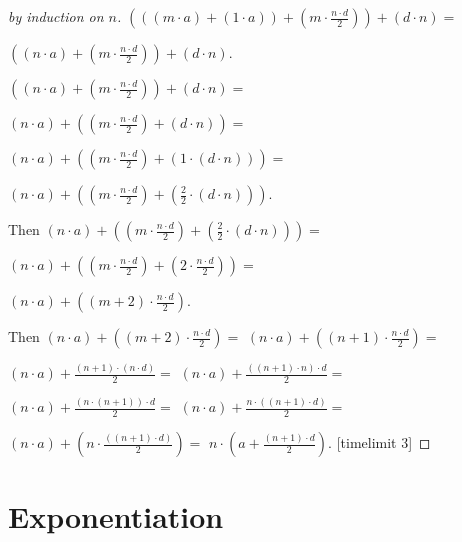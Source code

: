 \documentclass{article}
\begin{document}
\begin{forthel}
\begin{proof}[by induction on $n$]
$(((m \cdot a) + (1 \cdot a)) +  (m \cdot \frac{n \cdot d}{2})) + (d \cdot n) =$

$((n \cdot a) +  (m \cdot \frac{n \cdot d}{2})) + (d \cdot n)$.

$((n \cdot a) +  (m \cdot \frac{n \cdot d}{2})) + (d \cdot n) =$

$(n \cdot a) +  ((m \cdot \frac{n \cdot d}{2}) + (d \cdot n))=$

$(n \cdot a) +  ((m \cdot \frac{n \cdot d}{2}) + (1 \cdot (d \cdot n)))=$

$(n \cdot a) +  ((m \cdot \frac{n \cdot d}{2}) + (\frac{2}{2} \cdot (d \cdot n)))$.

Then $(n \cdot a) +  ((m \cdot \frac{n \cdot d}{2}) + (\frac{2}{2} \cdot (d \cdot n))) =$

$(n \cdot a) +  ((m \cdot \frac{n \cdot d}{2}) + (2 \cdot \frac{n \cdot d}{2})) =$

$(n \cdot a) +  ((m +2) \cdot \frac{n \cdot d}{2})$.

Then $(n \cdot a) + ((m +2) \cdot \frac{n \cdot d}{2}) =$
$(n \cdot a) +  ((n+1) \cdot \frac{n \cdot d}{2}) =$

$(n \cdot a) +  \frac{(n+1) \cdot (n \cdot d)}{2} =$
$(n \cdot a) +  \frac{((n+1) \cdot n) \cdot d}{2} =$

$(n \cdot a) +  \frac{(n \cdot (n+1)) \cdot d}{2} =$
$(n \cdot a) +  \frac{n \cdot ((n+1) \cdot d)}{2} =$

$(n \cdot a) +  (n \cdot \frac{((n+1) \cdot d)}{2}) =$
$n \cdot ( a + \frac{(n + 1) \cdot d}{2})$.
[timelimit 3]
\end{proof}
\end{forthel}


\section{Exponentiation}
\end{document}
